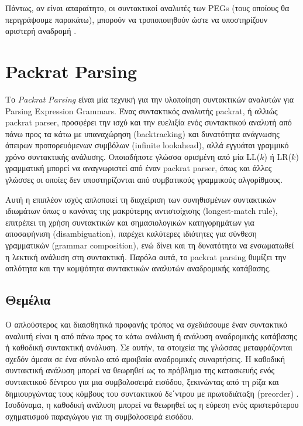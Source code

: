 \documentclass[diploma]{softlab-thesis}
\begin{document}
Πάντως, αν είναι απαραίτητο, οι συντακτικοί αναλυτές των PEGs (τους οποίους θα περιγράψουμε παρακάτω), μπορούν να τροποποιηθούν ώστε να υποστηρίζουν αριστερή αναδρομή \cite{Warth2008}.

\chapter{ Packrat Parsing }

Το \textit{Packrat Parsing} \cite{Ford2002a} είναι μία τεχνική για την υλοποίηση συντακτικών αναλυτών για Parsing Expression Grammars.
Ένας συντακτικός αναλυτής packrat, ή αλλιώς packrat parser, προσφέρει την ισχύ και την ευελιξία ενός συντακτικού αναλυτή από πάνω προς τα κάτω με υπαναχώρηση (backtracking) και δυνατότητα ανάγνωσης άπειρων προπορευόμενων συμβόλων (infinite lookahead), αλλά εγγυάται γραμμικό χρόνο συντακτικής ανάλυσης.
Οποιαδήποτε γλώσσα ορισμένη από μία LL($k$) ή LR($k$) γραμματική μπορεί να αναγνωριστεί από έναν packrat parser, όπως και άλλες γλώσσες οι οποίες δεν υποστηρίζονται από συμβατικούς γραμμικούς αλγορίθμους.

Αυτή η επιπλέον ισχύς απλοποιεί τη διαχείριση των συνηθισμένων συντακτικών ιδιωμάτων όπως ο κανόνας της μακρύτερης αντιστοίχισης (longest-match rule), επιτρέπει τη χρήση συντακτικών και σημασιολογικών κατηγορημάτων για αποσαφήνιση (disambiguation), παρέχει καλύτερες ιδιότητες για σύνθεση γραμματικών (grammar composition), ενώ δίνει και τη δυνατότητα να ενσωματωθεί η λεκτική ανάλυση στη συντακτική.
Παρόλα αυτά, το packrat parsing θυμίζει την απλότητα και την κομψότητα συντακτικών αναλυτών αναδρομικής κατάβασης.

\section{Θεμέλια}

Ο απλούστερος και διαισθητικά προφανής τρόπος να σχεδιάσουμε έναν συντακτικό αναλυτή είναι η από πάνω προς τα κάτω ανάλυση ή ανάλυση αναδρομικής κατάβασης ή καθοδική συντακτική ανάλυση.
Σε αυτήν, τα στοιχεία της γλώσσας μεταφράζονται σχεδόν άμεσα σε ένα σύνολο από αμοιβαία αναδρομικές συναρτήσεις.
Η καθοδική συντακτική ανάλυση μπορεί να θεωρηθεί ως το πρόβλημα της κατασκευής ενός συντακτικού δέντρου για μια συμβολοσειρά εισόδου, ξεκινώντας από τη ρίζα και δημιουργώντας τους κόμβους του συντακτικού δε΄ντρου με πρωτοδιάταξη (preorder) \cite{Aho2006}. Ισοδύναμα, η καθοδική ανάλυση μπορεί να θεωρηθεί ως η εύρεση ενός αριστερότερου σχηματισμού παραγώγου για τη συμβολοσειρά εισόδου.
\end{document}
